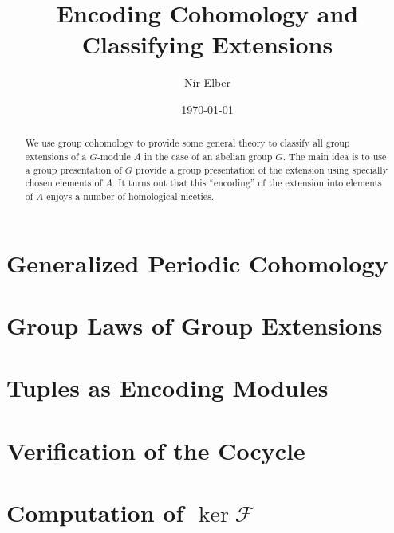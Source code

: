 \documentclass{article}
\title{Encoding Cohomology and Classifying Extensions}
\author{Nir Elber}
\date{\today}
\numberwithin{equation}{section}
\begin{document}
\maketitle

\begin{abstract}
	\noindent We use group cohomology to provide some general theory to classify all group extensions of a $ G$-module $A$ in the case of an abelian group $ G$. The main idea is to use a group presentation of $G$ provide a group presentation of the extension using specially chosen elements of $A$. It turns out that this ``encoding'' of the extension into elements of $A$ enjoys a number of homological niceties.
\end{abstract}

\setcounter{tocdepth}{4}
\tableofcontents

\section{Generalized Periodic Cohomology} \label{sec:crackpot}


\section{Group Laws of Group Extensions} \label{sec:general}




\section{Tuples as Encoding Modules} \label{sec:tuplestudy}


\printbibliography[title={References}]

\newpage
\appendix
\section{Verification of the Cocycle} \label{sec:verifycocycle}


\section{Computation of \texorpdfstring{$\ker\mathcal F$}{ker F}} \label{sec:havegensproof}

\end{document}
